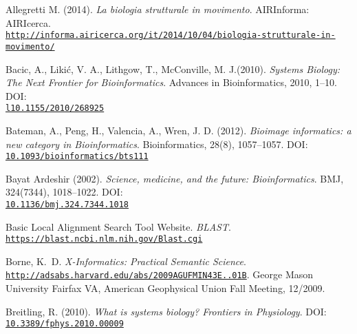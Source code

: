 \documentclass[twoside,openright,titlepage,fleqn,
,	headinclude,12pt,a4paper,BCOR5mm,footinclude,table]{scrbook}
\begin{document}
\begin{thebibliography}{50}

Allegretti M. (2014).\newline
\textit{La biologia strutturale in movimento}. \newline
AIRInforma: AIRIcerca.
\\\texttt{\url{http://informa.airicerca.org/it/2014/10/04/biologia-strutturale-in-movimento/}}

Bacic, A., Likić, V. A., Lithgow, T., McConville, M. J.(2010).\newline 
\textit{Systems Biology: The Next Frontier for Bioinformatics}.\newline
Advances in Bioinformatics, 2010, 1–10. \newline
DOI: \\\texttt{\url{l10.1155/2010/268925}}

Bateman, A., Peng, H., Valencia, A., Wren, J. D. (2012).\newline
\textit{Bioimage informatics: a new category in Bioinformatics}. \newline
Bioinformatics, 28(8), 1057–1057. \newline
DOI: \\\texttt{\url{10.1093/bioinformatics/bts111}}

Bayat Ardeshir (2002).\newline
\textit{Science, medicine, and the future: Bioinformatics}.\newline
BMJ, 324(7344), 1018–1022.
DOI: \\\texttt{\url{10.1136/bmj.324.7344.1018}}

Basic Local Alignment Search Tool Website.\newline
\textit{BLAST}.
\\\texttt{\url{https://blast.ncbi.nlm.nih.gov/Blast.cgi}}

Borne, K.~D.\newline
\textit{X-Informatics: Practical Semantic Science}.
\\\texttt{\url{http://adsabs.harvard.edu/abs/2009AGUFMIN43E..01B}}. \newline
George Mason University Fairfax VA, American Geophysical Union Fall Meeting, 12/2009.

Breitling, R. (2010). \newline
\textit{What is systems biology? Frontiers in Physiology}.\newline
DOI: \\\texttt{\url{10.3389/fphys.2010.00009}}


\end{thebibliography}
\end{document}
